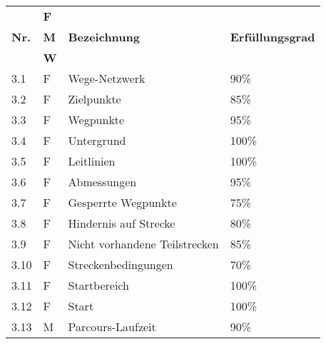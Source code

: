 \documentclass[main.tex]{subfiles} %
\begin{document}
\begin{tabular}{|l|p{0.5cm}|p{4cm}|p{10cm}|}
  \hline
               & \textbf{F} &                                  &                                                                                                                                                                                                                                                                                                                                                                                 \\
  \textbf{Nr.} & \textbf{M} & \textbf{Bezeichnung}             & \textbf{Erfüllungsgrad}                                                                                                                                                                                                                                                                                                                                                                                \\
               & \textbf{W} &                                  &                                                                                                                                                                                                                                                                                                                                                                         \\
  \hline
  3.1          & F              & Wege-Netzwerk                & 90\%                    \\
  3.2          & F              & Zielpunkte                   & 85\%                    \\
  3.3          & F              & Wegpunkte                    & 95\%                    \\
  3.4          & F              & Untergrund                   & 100\%                   \\
  3.5          & F              & Leitlinien                   & 100\%                   \\
  3.6          & F              & Abmessungen                  & 95\%                    \\
  3.7          & F              & Gesperrte Wegpunkte          & 75\%                    \\
  3.8          & F              & Hindernis auf Strecke        & 80\%                    \\
  3.9          & F              & Nicht vorhandene Teilstrecken & 85\%                   \\
  3.10         & F              & Streckenbedingungen          & 70\%                    \\
  3.11         & F              & Startbereich                 & 100\%                   \\
  3.12         & F              & Start                        & 100\%                   \\
  3.13         & M              & Parcours-Laufzeit            & 90\%                    \\
  \hline
\end{tabular}
\end{document}
